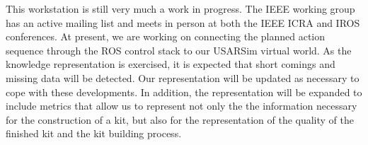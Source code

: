 This workstation is still very much a work in progress. The IEEE working group has an active mailing list and meets in person at both the IEEE ICRA and IROS conferences.
At present, we are working on connecting the planned action sequence through the ROS control stack to our USARSim virtual world. As the knowledge representation is
exercised, it is expected that short comings and missing data will be detected. Our representation will be updated as necessary to cope with these developments. In addition,
the representation will be expanded to include metrics that allow us to represent not only the the information necessary for the construction of a kit, but also for the representation
of the quality of the finished kit and the kit building process.





